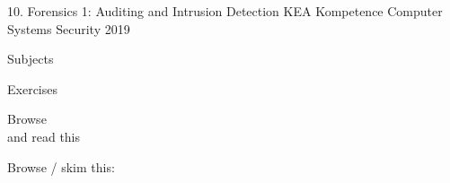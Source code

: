 \documentclass[Screen16to9,17pt]{foils}
\begin{document}
\mytitlepage
{10. Forensics 1: Auditing and Intrusion Detection}
{KEA Kompetence Computer Systems Security 2019}



\begin{list1}
\item Subjects
\begin{list2}
\item
\item
\item
\end{list2}
\item Exercises
\begin{list2}
\item
\item
\end{list2}
\end{list1}




\begin{list1}
\item Browse\\

and read this\\

\item Browse / skim this:\\

\end{list1}




\slidenext
\end{document}
